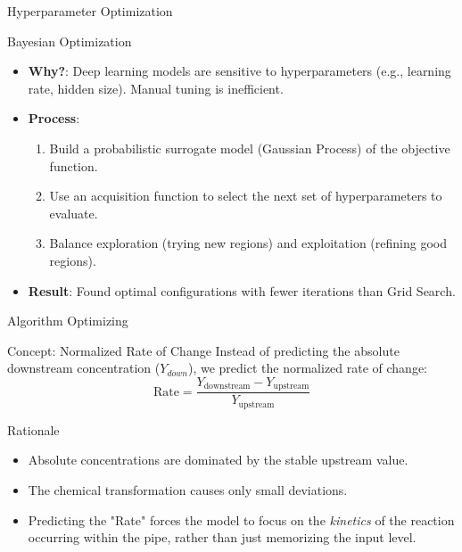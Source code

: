 \documentclass[xcolor=dvipsnames]{beamer}
\begin{document}
\begin{frame}{Hyperparameter Optimization}
  \begin{block}{Bayesian Optimization}
      \begin{itemize}
          \item \textbf{Why?}: Deep learning models are sensitive to hyperparameters (e.g., learning rate, hidden size). Manual tuning is inefficient.
          \item \textbf{Process}: 
          \begin{enumerate}
              \item Build a probabilistic surrogate model (Gaussian Process) of the objective function.
              \item Use an acquisition function to select the next set of hyperparameters to evaluate.
              \item Balance exploration (trying new regions) and exploitation (refining good regions).
          \end{enumerate}
          \item \textbf{Result}: Found optimal configurations with fewer iterations than Grid Search.
      \end{itemize}
  \end{block}
\end{frame}

\begin{frame}{Algorithm Optimizing}
  \small
  \begin{block}{Concept: Normalized Rate of Change}
    Instead of predicting the absolute downstream concentration ($Y_{down}$), we predict the normalized rate of change:
    \[ \text{Rate} = \frac{Y_{\text{downstream}} - Y_{\text{upstream}}}{Y_{\text{upstream}}} \]
  \end{block}
  \begin{block}{Rationale}
      \begin{itemize}
          \item Absolute concentrations are dominated by the stable upstream value.
          \item The chemical transformation causes only small deviations.
          \item Predicting the "Rate" forces the model to focus on the \textit{kinetics} of the reaction occurring within the pipe, rather than just memorizing the input level.
      \end{itemize}
  \end{block}
\end{frame}
\end{document}
